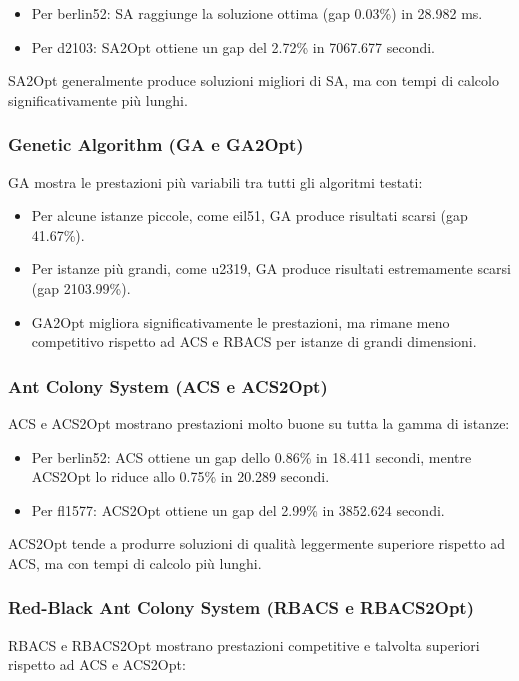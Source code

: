 \begin{itemize}
	\item Per berlin52: SA raggiunge la soluzione ottima (gap 0.03\%) in 28.982 ms.
	\item Per d2103: SA2Opt ottiene un gap del 2.72\% in 7067.677 secondi.
\end{itemize}

SA2Opt generalmente produce soluzioni migliori di SA, ma con tempi di calcolo significativamente più lunghi.

\subsubsection{Genetic Algorithm (GA e GA2Opt)}
GA mostra le prestazioni più variabili tra tutti gli algoritmi testati:

\begin{itemize}
	\item Per alcune istanze piccole, come eil51, GA produce risultati scarsi (gap 41.67\%).
	\item Per istanze più grandi, come u2319, GA produce risultati estremamente scarsi (gap 2103.99\%).
	\item GA2Opt migliora significativamente le prestazioni, ma rimane meno competitivo rispetto ad ACS e RBACS per istanze di grandi dimensioni.
\end{itemize}

\subsubsection{Ant Colony System (ACS e ACS2Opt)}
ACS e ACS2Opt mostrano prestazioni molto buone su tutta la gamma di istanze:

\begin{itemize}
	\item Per berlin52: ACS ottiene un gap dello 0.86\% in 18.411 secondi, mentre ACS2Opt lo riduce allo 0.75\% in 20.289 secondi.
	\item Per fl1577: ACS2Opt ottiene un gap del 2.99\% in 3852.624 secondi.
\end{itemize}

ACS2Opt tende a produrre soluzioni di qualità leggermente superiore rispetto ad ACS, ma con tempi di calcolo più lunghi.

\subsubsection{Red-Black Ant Colony System (RBACS e RBACS2Opt)}
RBACS e RBACS2Opt mostrano prestazioni competitive e talvolta superiori rispetto ad ACS e ACS2Opt:

